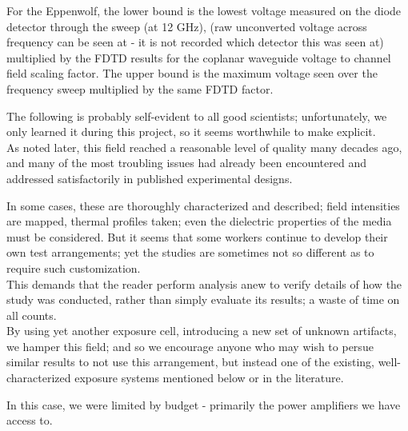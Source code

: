 \documentclass[paper.tex]{subfiles}
\begin{document}
\begin{multicols}{1}
For the Eppenwolf, the lower bound is the lowest voltage measured on the diode detector through the sweep (at 12 GHz), (raw unconverted voltage across frequency can be seen at - it is not recorded which detector this was seen at) multiplied by the FDTD results for the coplanar waveguide voltage to channel field scaling factor. The upper bound is the maximum voltage seen over the frequency sweep multiplied by the same FDTD factor.






\begin{tcolorbox}
	
	The following is probably self-evident to all good scientists; unfortunately, we only learned it during this project, so it seems worthwhile to make explicit.\\
	
	As noted later, this field reached a reasonable level of quality many decades ago, and many of the most troubling issues had already been encountered and addressed satisfactorily in published experimental designs\cite{Biological1984}. 
	
	In some cases, these are thoroughly characterized and described; field intensities are mapped, thermal profiles taken; even the dielectric properties of the media must be considered. But it seems that some workers continue to develop their own test arrangements; yet the studies are sometimes not so different as to require such customization. \\
	
	This demands that the reader perform analysis anew to verify details of how the study was conducted, rather than simply evaluate its results; a waste of time on all counts.\\
	
	By using yet another exposure cell, introducing a new set of unknown artifacts, we hamper this field; and so we encourage anyone who may wish to persue similar results to not use this arrangement, but instead one of the existing, well-characterized exposure systems mentioned below or in the literature.
	
	In this case, we were limited by budget - primarily the power amplifiers we have access to.
	
\end{tcolorbox}





\end{multicols}
\end{document}
